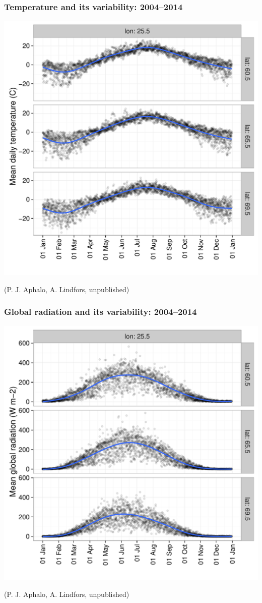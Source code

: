 \documentclass[10pt]{beamer}\usepackage[]{graphicx}\usepackage[]{color}
\begin{document}
\begin{frame}
  \frametitle{Temperature and its variability: 2004--2014}
  \centering
  \includegraphics[width=0.65\linewidth]{figures/fig-anders2.pdf}
  
  (P. J. Aphalo, A. Lindfors, unpublished)
\end{frame}

\begin{frame}
  \frametitle{Global radiation and its variability: 2004--2014}
  \centering
  \includegraphics[width=0.65\linewidth]{figures/fig-anders3.pdf}
  
  (P. J. Aphalo, A. Lindfors, unpublished)
\end{frame}
\end{document}
